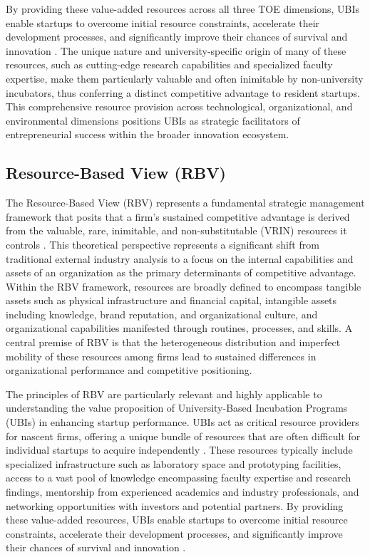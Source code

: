 \documentclass[../Main.tex]{subfiles}
\begin{document}
By providing these value-added resources across all three TOE dimensions, UBIs enable startups to overcome initial resource constraints, accelerate their development processes, and significantly improve their chances of survival and innovation \autocite{mian1996assessing}. The unique nature and university-specific origin of many of these resources, such as cutting-edge research capabilities and specialized faculty expertise, make them particularly valuable and often inimitable by non-university incubators, thus conferring a distinct competitive advantage to resident startups. This comprehensive resource provision across technological, organizational, and environmental dimensions positions UBIs as strategic facilitators of entrepreneurial success within the broader innovation ecosystem.

\subsection{Resource-Based View (RBV)}

The Resource-Based View (RBV) represents a fundamental strategic management framework that posits that a firm's sustained competitive advantage is derived from the valuable, rare, inimitable, and non-substitutable (VRIN) resources it controls \autocite{barney1991firm}. This theoretical perspective represents a significant shift from traditional external industry analysis to a focus on the internal capabilities and assets of an organization as the primary determinants of competitive advantage. Within the RBV framework, resources are broadly defined to encompass tangible assets such as physical infrastructure and financial capital, intangible assets including knowledge, brand reputation, and organizational culture, and organizational capabilities manifested through routines, processes, and skills. A central premise of RBV is that the heterogeneous distribution and imperfect mobility of these resources among firms lead to sustained differences in organizational performance and competitive positioning.

The principles of RBV are particularly relevant and highly applicable to understanding the value proposition of University-Based Incubation Programs (UBIs) in enhancing startup performance. UBIs act as critical resource providers for nascent firms, offering a unique bundle of resources that are often difficult for individual startups to acquire independently \autocite{mian1996assessing}. These resources typically include specialized infrastructure such as laboratory space and prototyping facilities, access to a vast pool of knowledge encompassing faculty expertise and research findings, mentorship from experienced academics and industry professionals, and networking opportunities with investors and potential partners. By providing these value-added resources, UBIs enable startups to overcome initial resource constraints, accelerate their development processes, and significantly improve their chances of survival and innovation \autocite{mian1996assessing}.
\end{document}
